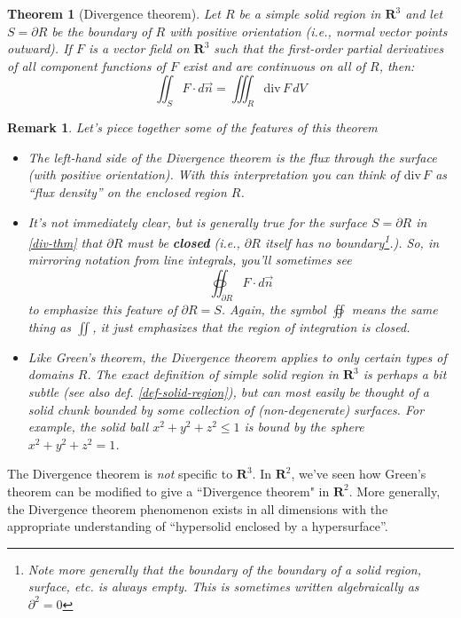 \documentclass[12pt]{article}
\numberwithin{equation}{subsection}
\numberwithin{figure}{subsection}
\newtheorem{thm}[subsection]{Theorem}
\theoremstyle{note}
\newtheorem{remark}[subsection]{Remark}
\newcommand{\dv}{\mathrm{div\,}}
\begin{document}
{\begin{thm}[Divergence theorem]\label{thm-divergence} Let $R$ be a simple solid region in $\mathbf{R}^3$ and let $S=\partial R$ be the boundary of $R$ with positive orientation (i.e., normal vector points outward). If $F$ is a vector field on $\mathbf{R}^3$ such that the first-order partial derivatives of all component functions of $F$ exist and are continuous on all of $R$, then:
\begin{equation} \label{div-thm}
	\iint_{S} F\cdot d\vec{n}= \iiint_R \dv F \,dV 
\end{equation}
\end{thm}

\begin{remark} Let's piece together some of the features of this theorem
\begin{itemize}
\item The left-hand side of the Divergence theorem is the \textit{flux} through the surface (with positive orientation). With this interpretation you can think of $\dv F$ as ``flux density'' on the enclosed region $R$. 



 \item It's not immediately clear, but is generally true for the surface $S=\partial R$ in \eqref{div-thm} that $\partial R$ must be \textbf{closed} (i.e., $\partial R$ itself has no boundary\footnote{Note more generally that the boundary of the boundary of a solid region, surface, etc. is always empty. This is sometimes written algebraically as $\partial^2=0$}.). So, in mirroring notation from line integrals, you'll sometimes see \[ \oiint_{\partial R} F\cdot d\vec{n}\] to emphasize this feature of $\partial R=S $. Again, the symbol $\displaystyle \oiint$ means the same thing as $\displaystyle \iint$, it just emphasizes that the region of integration is closed. 

\item Like Green's theorem, the Divergence theorem applies to only certain types of domains $R$. The exact definition of \textit{simple solid region in $\mathbf{R}^3$} is perhaps a bit subtle (see also def. \ref{def-solid-region}), but can most easily be thought of a solid chunk bounded by some collection of (non-degenerate) surfaces. For example, the solid ball $x^2+y^2+z^2\leq 1$ is bound by the sphere $x^2+y^2+z^2=1$. 
\end{itemize}
\end{remark}

 The Divergence theorem is \textit{not} specific to $\mathbf{R}^3$. In $\mathbf{R}^2$, we've seen how Green's theorem can be modified to give a ``Divergence theorem" in $\mathbf{R}^2$. More generally, the Divergence theorem phenomenon exists in all dimensions with the appropriate understanding of ``hypersolid enclosed by a hypersurface''.



}
\end{document}
